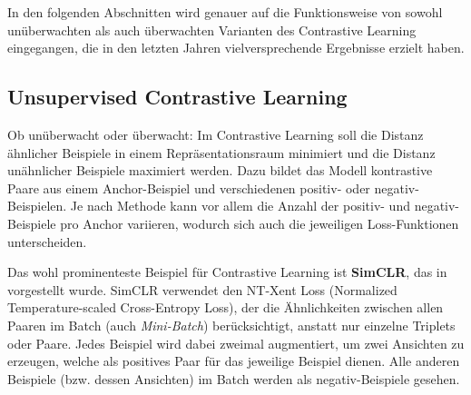 In den folgenden Abschnitten wird genauer auf die Funktionsweise von sowohl unüberwachten als auch überwachten Varianten des Contrastive Learning eingegangen, die in den letzten Jahren vielversprechende Ergebnisse erzielt haben.

\subsection{Unsupervised Contrastive Learning} \label{subsec-unsup-contrastive}

Ob unüberwacht oder überwacht: Im Contrastive Learning soll die Distanz ähnlicher Beispiele in einem Repräsentationsraum minimiert und die Distanz unähnlicher Beispiele maximiert werden. Dazu bildet das Modell kontrastive Paare aus einem Anchor-Beispiel und verschiedenen positiv- oder negativ-Beispielen. Je nach Methode kann vor allem die Anzahl der positiv- und negativ-Beispiele pro Anchor variieren, wodurch sich auch die jeweiligen Loss-Funktionen unterscheiden.

Das wohl prominenteste Beispiel für Contrastive Learning ist \textbf{SimCLR}, das in \parencite{Chen2020simclr} vorgestellt wurde. SimCLR verwendet den NT-Xent Loss (Normalized Temperature-scaled Cross-Entropy Loss), der die Ähnlichkeiten zwischen allen Paaren im Batch (auch \textit{Mini-Batch}) berücksichtigt, anstatt nur einzelne Triplets oder Paare. Jedes Beispiel wird dabei zweimal augmentiert, um zwei Ansichten zu erzeugen, welche als positives Paar für das jeweilige Beispiel dienen. Alle anderen Beispiele (bzw. dessen Ansichten) im Batch werden als negativ-Beispiele gesehen.

